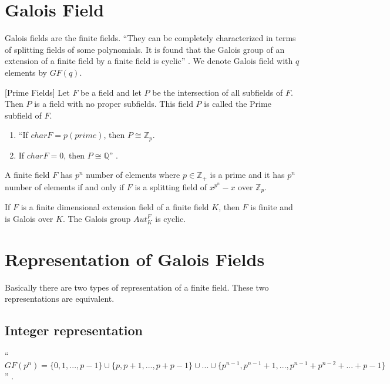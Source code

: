 \section{Galois Field}
Galois fields are the finite fields. ``They can be completely characterized in terms of splitting fields of some polynomials. It is found that the Galois group of an extension of a finite field by a finite field is cyclic'' \cite{hunger}. We denote Galois field with \(q\) elements by \(GF(q)\).

\begin{definition} \cite{hunger} [Prime Fields]
Let \(F\) be a field and let \(P\) be the intersection of all subfields of \(F\). Then \(P\) is a field with no proper subfields. This field \(P\) is called the Prime subfield of \(F\).
\end{definition}

\begin{enumerate}
\item ``If \(charF=p(prime)\), then \(P\cong {\mathbb{Z}}_p\).
\item If \(charF=0\), then \(P\cong \mathbb{Q}\)'' \cite{hunger}.
\end{enumerate}

\begin{theorem} \cite{hunger}
A  finite field \(F\) has \(p^n\) number of elements where \(p \in \mathbb{Z}_+\) is a prime and it has \(p^n\) number of elements if and only if \(F\) is a splitting field of \(x^{p^n} - x\) over \(\mathbb{Z}_p\).
\end{theorem}
\vspace{4mm}

\begin{theorem} \cite{hunger}
  If \(F\) is a finite dimensional extension field of a finite field \(K\), then \(F\) is finite and is Galois over \(K\). The Galois group \(Aut_K^F\) is cyclic.
\end{theorem}
\clearpage

\section{Representation of Galois Fields}
Basically there are two types of representation of a finite field. These two representations are equivalent.
\subsection{Integer representation}

``\(GF(p^n)=\{0,1,...,p-1\} \cup \{p,p+1,...,p+p-1\} \cup ... \cup \{p^{n-1},p^{n-1}+1,...,p^{n-1}+p^{n-2}+...+p-1\}\)'' \cite{galois}.

